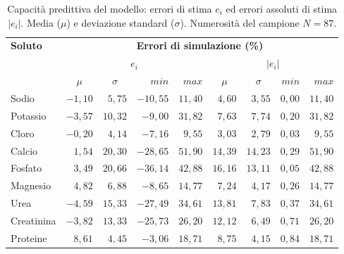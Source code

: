 \documentclass[10pt,twoside]{book}
\begin{document}
\begin{table}[htb]
	\centering
	\caption{Capacità predittiva del modello: errori di stima $e_i$ ed errori assoluti di stima $|e_i|$. Media ($\mu$) e deviazione standard ($\sigma$). Numerosità del campione $N=87$.}\label{tab:descrizione}
	\begin{tabular}{lrrrrrrrr}
	\toprule 
		\textbf{Soluto}   &  \multicolumn{8}{c}{\textbf{Errori di simulazione (\%)}}  \\
		\cmidrule(lr){2-9}
				              &        \multicolumn{4}{c}{$e_i$}             &       \multicolumn{4}{c}{$|e_i|$}             \\
		                  & \multicolumn{1}{c}{$\mu$}      & \multicolumn{1}{c}{$\sigma$}   & $min$   & $max$   & \multicolumn{1}{c}{$\mu$}     & \multicolumn{1}{c}{$\sigma$}   & $min$   & $max$  \\
    \cmidrule(lr){2-5}\cmidrule(lr){6-9}
  	Sodio             & $ -1,10$    & $ 5,75$    & $ -10,55$  & $11,40$   & $4,60$   & $3,55$     & $0,00$ & $11,40$   \\
  	Potassio          & $-3,57$     & $ 10,32$    & $-9,00$   & $31,82$  & $7,63$   & $7,74$     & $0,20$ & $31,82$  \\
  	Cloro             & $-0,20$     & $ 4,14$    & $ -7,16$   & $9,55$   & $3,03$   & $2,79$     & $0,03$ & $ 9,55$   \\
  	Calcio            & $1,54$     & $ 20,30$   & $ -28,65$  & $51,90$  & $14,39$  & $14,23$    & $0,29$ & $51,90$  \\
  	Fosfato           & $3,49$     & $ 20,66$   & $-36,14$   & $42,88$  & $16,16$  & $13,11$    & $0,05$ & $42,88$  \\
  	Magnesio          & $ 4,82$     & $ 6,88$    & $ -8,65$   & $14,77$   & $7,24$   & $4,17$     & $0,26$ & $14,77$  \\
  	Urea              & $-4,59$     & $15,33$    & $-27,49$   & $34,61$  & $13,81$  & $7,83$     & $0,37$ & $34,61$  \\
  	Creatinina        & $-3,82$     & $13,33$    & $-25,73$   & $26,20$  & $12,12$  & $6,49$     & $0,71$ & $26,20$  \\
  	Proteine          & $ 8,61$     & $4,45$     & $ -3,06$   & $18,71$  & $8,75$   & $4,15$     & $0,84$ & $18,71$  \\
  \bottomrule
\end{tabular}
\end{table}
\end{document}
